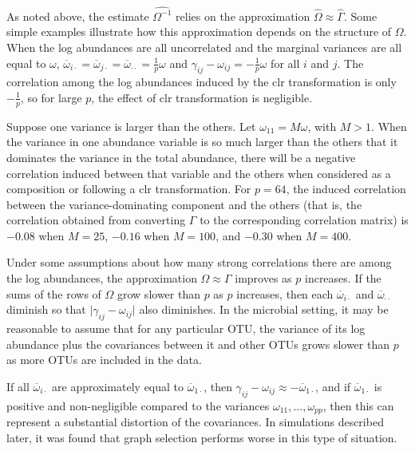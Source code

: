 \documentclass[10pt]{article}
\begin{document}
As noted above, the estimate $\widehat{\Omega^{-1}}$ relies on the approximation $\hat{\Omega} \approx \hat{\Gamma}$. Some simple examples illustrate how this approximation depends on the structure of $\Omega$. When the log abundances are all uncorrelated and the marginal variances are all equal to $\omega$, $\overline{\omega}_{i\cdot} = \overline{\omega}_{j\cdot} = \overline{\omega}_{\cdot\cdot} = \frac{1}{p}\omega$ and $\gamma_{ij} - \omega_{ij} = -\frac{1}{p}\omega$ for all $i$ and $j$. The correlation among the log abundances induced by the clr transformation is only $-\frac{1}{p}$, so for large $p$, the effect of clr transformation is negligible.

Suppose one variance is larger than the others. Let $\omega_{11} = M\omega$, with $M > 1$. When the variance in one abundance variable is so much larger than the others that it dominates the variance in the total abundance, there will be a negative correlation induced between that variable and the others when considered as a composition or following a clr transformation. For $p = 64$, the induced correlation between the variance-dominating component and the others (that is, the correlation obtained from converting $\Gamma$ to the corresponding correlation matrix) is $-0.08$ when $M = 25$, $-0.16$ when $M = 100$, and $-0.30$ when $M = 400$.

Under some assumptions about how many strong correlations there are among the log abundances, the approximation $\Omega \approx \Gamma$ improves as $p$ increases. If the sums of the rows of $\Omega$ grow slower than $p$ as $p$ increases, then each $\overline{\omega}_{i\cdot}$ and $\overline{\omega}_{\cdot\cdot}$ diminish so that $\vert \gamma_{ij} - \omega_{ij} \rvert$ also diminishes. In the microbial setting, it may be reasonable to assume that for any particular OTU, the variance of its log abundance plus the covariances between it and other OTUs grows slower than $p$ as more OTUs are included in the data.

If all $\overline{\omega}_{i\cdot}$ are approximately equal to $\overline{\omega}_{1\cdot}$, then $\gamma_{ij} - \omega_{ij} \approx -\overline{\omega}_{1\cdot}$, and if $\overline{\omega}_{1\cdot}$ is positive and non-negligible compared to the variances $\omega_{11}, \dots, \omega_{pp}$, then this can represent a substantial distortion of the covariances. In simulations described later, it was found that graph selection performs worse in this type of situation.
\end{document}
